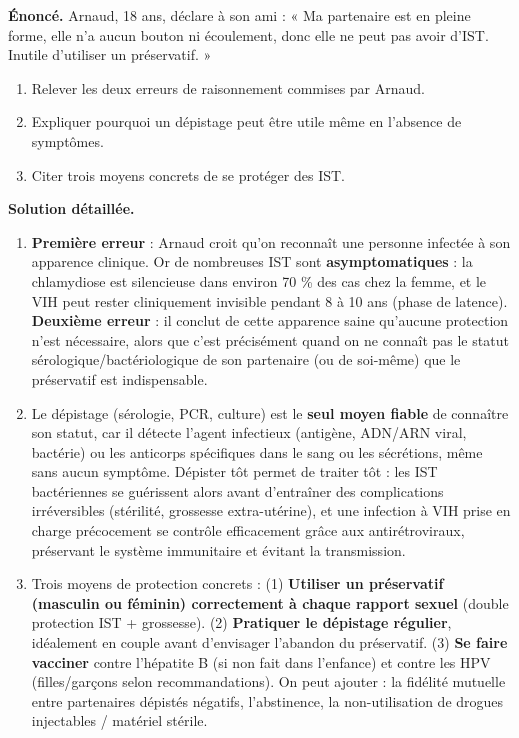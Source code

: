 \documentclass[11pt]{article}
\begin{document}
\begin{exoresolu}
\textbf{Énoncé.} Arnaud, 18 ans, déclare à son ami : « Ma partenaire est en pleine forme, elle n'a aucun bouton ni écoulement, donc elle ne peut pas avoir d'IST. Inutile d'utiliser un préservatif. »
\begin{enumerate}
\item Relever les deux erreurs de raisonnement commises par Arnaud.
\item Expliquer pourquoi un dépistage peut être utile même en l'absence de symptômes.
\item Citer trois moyens concrets de se protéger des IST.
\end{enumerate}
\tcblower
\textbf{Solution détaillée.}
\begin{enumerate}
\item \textbf{Première erreur} : Arnaud croit qu'on reconnaît une personne infectée à son apparence clinique. Or de nombreuses IST sont \textbf{asymptomatiques} : la chlamydiose est silencieuse dans environ 70 \% des cas chez la femme, et le VIH peut rester cliniquement invisible pendant 8 à 10 ans (phase de latence). \textbf{Deuxième erreur} : il conclut de cette apparence saine qu'aucune protection n'est nécessaire, alors que c'est précisément quand on ne connaît pas le statut sérologique/bactériologique de son partenaire (ou de soi-même) que le préservatif est indispensable.
\item Le dépistage (sérologie, PCR, culture) est le \textbf{seul moyen fiable} de connaître son statut, car il détecte l'agent infectieux (antigène, ADN/ARN viral, bactérie) ou les anticorps spécifiques dans le sang ou les sécrétions, même sans aucun symptôme. Dépister tôt permet de traiter tôt : les IST bactériennes se guérissent alors avant d'entraîner des complications irréversibles (stérilité, grossesse extra-utérine), et une infection à VIH prise en charge précocement se contrôle efficacement grâce aux antirétroviraux, préservant le système immunitaire et évitant la transmission.
\item Trois moyens de protection concrets : (1) \textbf{Utiliser un préservatif (masculin ou féminin) correctement à chaque rapport sexuel} (double protection IST + grossesse). (2) \textbf{Pratiquer le dépistage régulier}, idéalement en couple avant d'envisager l'abandon du préservatif. (3) \textbf{Se faire vacciner} contre l'hépatite B (si non fait dans l'enfance) et contre les HPV (filles/garçons selon recommandations). On peut ajouter : la fidélité mutuelle entre partenaires dépistés négatifs, l'abstinence, la non-utilisation de drogues injectables / matériel stérile.
\end{enumerate}
\end{exoresolu}
\end{document}
